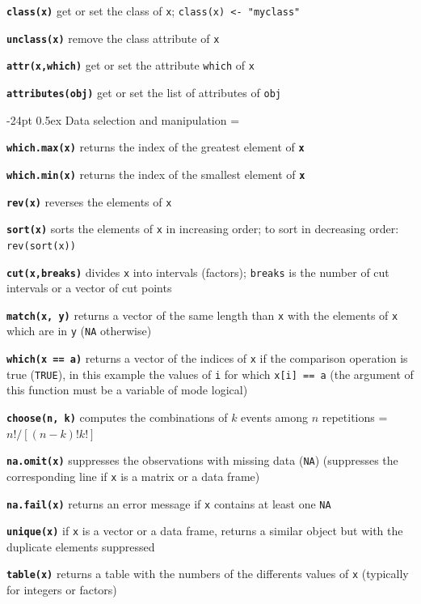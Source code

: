 \documentclass[10pt,landscape]{article}
\makeatletter
\renewcommand\section{\@startsection{section}{1}{0mm}%
                                     {-24pt}%
                                     {0.5ex}%
                                {\color{blue}\normalfont\large\bfseries}}
\newcommand{\code}{\texttt}
\newcommand{\bcode}[1]{\texttt{\textbf{#1}}}
\newcommand\T{\code{TRUE}}
\makeatother
\begin{document}
\begin{multicols}{3}
\bcode{class(x)} get or set the class of \code{x}; \code{class(x) <- "myclass"}

\bcode{unclass(x)} remove the class attribute of \code{x}

\bcode{attr(x,which)} get or set the attribute \code{which} of \code{x}

\bcode{attributes(obj)} get or set the list of attributes of \code{obj}





\section{Data selection and manipulation}
\everypar={\hangindent=9mm}

\bcode{which.max(x)}  returns the index of the greatest element of
\bcode{x}

\bcode{which.min(x)}  returns the index of the smallest element of
\bcode{x}

\bcode{rev(x)}  reverses the elements of \code{x}

\bcode{sort(x)}  sorts the elements of \code{x} in increasing order; to sort in decreasing order: \code{rev(sort(x))}

\bcode{cut(x,breaks)}  divides \code{x} into intervals (factors);
\code{breaks} is the number of cut intervals or a vector of cut points

\bcode{match(x, y)}  returns a vector of the same length than \code{x} with the elements of \code{x} which are in \code{y} (\code{NA} otherwise)

\bcode{which(x == a)}  returns a vector of the indices of \code{x} if the comparison operation is true (\T), in this example the values of \code{i} for which \code{x[i] == a} (the argument of this function must be a variable of mode logical)

\bcode{choose(n, k)}  computes the combinations of $k$ events among $n$ repetitions = $n!/[(n-k)!k!]$

\bcode{na.omit(x)}  suppresses the observations with missing data (\code{NA}) (suppresses the corresponding line if \code{x} is a matrix or a data frame)

\bcode{na.fail(x)}  returns an error message if \code{x} contains at least one \code{NA}

\bcode{unique(x)}  if \code{x} is a vector or a data frame, returns a similar object but with the duplicate elements suppressed

\bcode{table(x)}  returns a table with the numbers of the differents values of \code{x} (typically for integers or factors)


\end{multicols}
\end{document}
